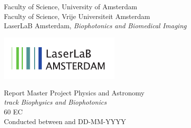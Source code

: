 \begin{titlepage}
    \begin{center}

        \vfill

        \begingroup
        \centering
        \endgroup


         \bigskip

        Faculty of Science, University of Amsterdam \\
        Faculty of Science, Vrije Universiteit Amsterdam \\ \smallskip
        LaserLaB Amsterdam, \emph{Biophotonics and Biomedical Imaging}

        \vfill

        \includegraphics[width=6cm]{frontbackmatter/images/laserlab-logo.pdf}

        \vfill

        Report Master Project Physics and Astronomy \\
        \emph{track Biophysics and Biophotonics} \\
        60 EC \\
        Conducted between  and DD-MM-YYYY%


\end{center}
\end{titlepage}
